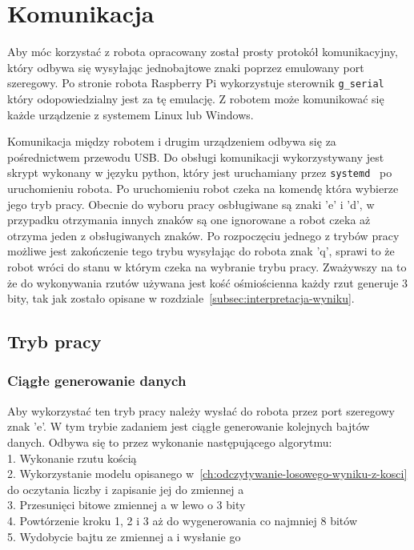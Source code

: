 \chapter{Komunikacja}\label{ch:komunikacja}
Aby móc korzystać z robota opracowany został prosty protokół komunikacyjny, który 
odbywa się wysyłając jednobajtowe znaki poprzez emulowany port szeregowy. Po stronie robota Raspberry Pi wykorzystuje 
sterownik \texttt{g\_serial}~\cite{g_serial} który odopowiedzialny jest za tę emulację. Z robotem może komunikować się 
każde urządzenie z systemem Linux lub Windows. 

Komunikacja między robotem i drugim urządzeniem odbywa się za pośrednictwem przewodu USB.
Do obsługi komunikacji wykorzystywany jest skrypt wykonany w języku python, który jest uruchamiany 
przez \texttt{systemd}~\cite{systemd} po uruchomieniu robota. Po uruchomieniu robot czeka na komendę która wybierze jego tryb pracy.
Obecnie do wyboru pracy osbługiwane są znaki 'e' i 'd', w przypadku otrzymania innych znaków są one ignorowane a robot czeka aż otrzyma jeden z obsługiwanych znaków.
Po rozpoczęciu jednego z trybów pracy możliwe jest zakończenie tego trybu wysyłając do robota znak 'q', sprawi to że robot wróci do stanu w którym czeka na wybranie 
trybu pracy. Zważywszy na to że do wykonywania rzutów używana jest kość ośmiościenna 
każdy rzut generuje 3 bity, tak jak zostało opisane w rozdziale~\ref{subsec:interpretacja-wyniku}.


\section{Tryb pracy} 

\subsection{Ciągłe generowanie danych}
Aby wykorzystać ten tryb pracy należy wysłać do robota przez port szeregowy znak 'e'.
W tym trybie zadaniem jest ciągłe generowanie kolejnych bajtów danych.
Odbywa się to przez wykonanie następującego algorytmu:\\
1. Wykonanie rzutu kością \\
2. Wykorzystanie modelu opisanego w~\ref{ch:odczytywanie-losowego-wyniku-z-kosci} do oczytania liczby i zapisanie jej do zmiennej a \\
3. Przesunięci bitowe zmiennej a w lewo o 3 bity \\
4. Powtórzenie kroku 1, 2 i 3 aż do wygenerowania co najmniej 8 bitów \\
5. Wydobycie bajtu ze zmiennej a i wysłanie go \\

